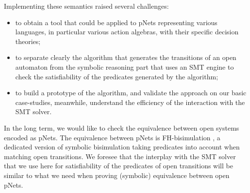 \documentclass[smallcondensed]{svjour3}
\begin{document}
Implementing these semantics raised several challenges:
\begin{itemize}
	\item to obtain a tool that could be applied to pNets representing
	various languages, in particular various action algebras,
	with their specific decision theories;
	\item to separate clearly the 
	algorithm that generates the transitions of an open automaton from
	the symbolic reasoning part that uses an SMT
	engine to check the
	satisfiability of the predicates generated by the algorithm;

	\item to build a prototype of the algorithm, and validate the approach on our basic
	case-studies, meanwhile, understand the efficiency of the interaction
	with the SMT solver.
\end{itemize}

In the long term, we would like to check the equivalence between
open systems encoded as pNets. The equivalence between pNets is
FH-bisimulation \cite{henrio:Forte2016}, a dedicated version of
symbolic bisimulation taking 
predicates into account when matching 
open transitions. We foresee that the interplay with the SMT solver
that we use here for satisfiability of the predicates of open transitions will be
similar to what we need when proving (symbolic) equivalence between open
pNets. 
\end{document}
